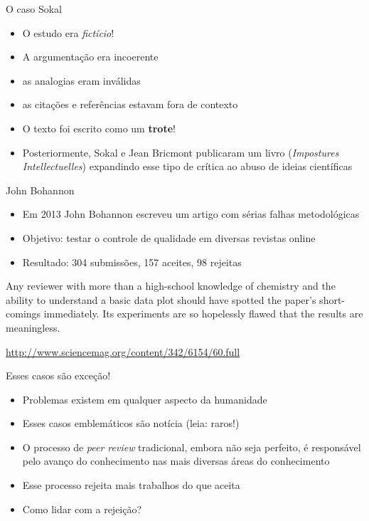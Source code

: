 \documentclass{beamer}
\begin{document}
\begin{frame}{O caso Sokal}
  \begin{itemize}
  \item O estudo era {\em fictício}!
  \item A argumentação era incoerente
  \item as analogias eram inválidas
  \item as citações e referências estavam fora de contexto
  \item O texto foi escrito como um {\bf trote}!
  \item Posteriormente, Sokal e Jean Bricmont publicaram um livro
    ({\em Impostures Intellectuelles}) expandindo esse tipo de crítica
    ao abuso de ideias científicas
  \end{itemize}
\end{frame}

\begin{frame}{John Bohannon}
  \begin{itemize}
  \item Em 2013 John Bohannon escreveu um artigo com sérias falhas
    metodológicas
  \item Objetivo: testar o controle de qualidade em diversas revistas
    online
  \item Resultado: 304 submissões, 157 aceites, 98 rejeitas
  \end{itemize}
  \begin{block}{}
    Any reviewer with more than a high-school knowledge of chemistry
    and the ability to understand a basic data plot should have
    spotted the paper's short-comings immediately. Its experiments are
    so hopelessly flawed that the results are meaningless.
  \end{block}
  \url{http://www.sciencemag.org/content/342/6154/60.full}
\end{frame}

\begin{frame}{Esses casos são exceção!}
  \begin{itemize}
  \item Problemas existem em qualquer aspecto da humanidade
  \item Esses casos emblemáticos são notícia (leia: raros!)
  \item O processo de {\em peer review} tradicional, embora não seja
    perfeito, é responsável pelo avanço do conhecimento nas mais
    diversas áreas do conhecimento
  \item Esse processo rejeita mais trabalhos do que aceita
  \item Como lidar com a rejeição?
  \end{itemize}
\end{frame}
\end{document}
